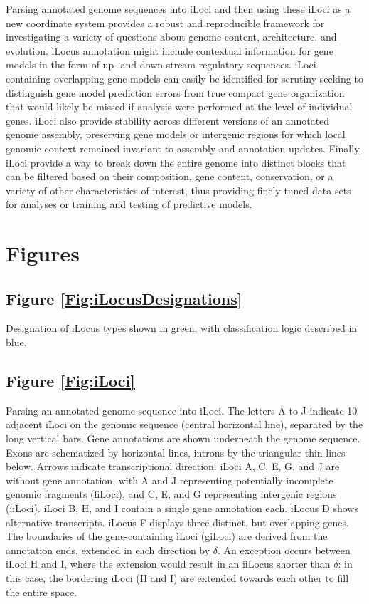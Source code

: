 Parsing annotated genome sequences into iLoci and then using these iLoci as a new coordinate system provides a robust and reproducible framework for investigating a variety of questions about genome content, architecture, and evolution.
iLocus annotation might include contextual information for gene models in the form of up- and down-stream regulatory sequences.
iLoci containing overlapping gene models can easily be identified for scrutiny seeking to distinguish gene model prediction errors from true compact gene organization that would likely be missed if analysis were performed at the level of individual genes.
iLoci also provide stability across different versions of an annotated genome assembly, preserving gene models or intergenic regions for which local genomic context remained invariant to assembly and annotation updates.
Finally, iLoci provide a way to break down the entire genome into distinct blocks that can be filtered based on their composition, gene content, conservation, or a variety of other characteristics of interest, thus providing finely tuned data sets for analyses or training and testing of predictive models.


\newpage
\section*{Figures} %

\subsection*{Figure \ref{Fig:iLocusDesignations}}

\noindent
Designation of iLocus types shown in green, with classification logic described in blue.

\subsection*{Figure \ref{Fig:iLoci}}

\noindent
Parsing an annotated genome sequence into iLoci.
The letters A to J indicate 10 adjacent iLoci on the genomic sequence (central horizontal line), separated by the long vertical bars.
Gene annotations are shown underneath the genome sequence.
Exons are schematized by horizontal lines, introns by the triangular thin lines below.
Arrows indicate transcriptional direction.
iLoci A, C, E, G, and J are without gene annotation, with A and J representing potentially incomplete genomic fragments (fiLoci), and C, E, and G representing intergenic regions (iiLoci).
iLoci B, H, and I contain a single gene annotation each.
iLocus D shows alternative transcripts.
iLocus F displays three distinct, but overlapping genes.
The boundaries of the gene-containing iLoci (giLoci) are derived from the annotation ends, extended in each direction by $\delta$.
An exception occurs between iLoci H and I, where the extension would result in an iiLocus shorter than $\delta$: in this case, the bordering iLoci (H and I) are extended towards each other to fill the entire space.


